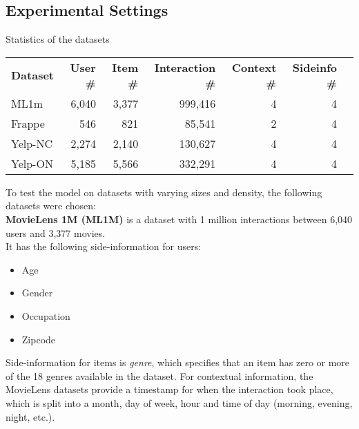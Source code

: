 \subsection{Experimental Settings}
\begin{adjustwidth}{-2.5 cm}{-2.5 cm}\centering
\begin{threeparttable}[!htb]
\caption{Statistics of the datasets}\label{tab:datasetstats}
\scriptsize
\begin{tabular}{lrrrrrr}\toprule
\textbf{Dataset} &\textbf{User \#} &\textbf{Item \#} &\textbf{Interaction \#} &\textbf{Context \#} &\textbf{Sideinfo \#} \\\cmidrule{1-6}
ML1m &6,040 &3,377 &999,416 &4 &4 \\\cmidrule{1-6}
Frappe &546 & 821 &85,541 &2 &4 \\\cmidrule{1-6}
Yelp-NC &2,274 &2,140 &130,627 &4 &4 \\\cmidrule{1-6}
Yelp-ON &5,185 &5,566 &332,291 &4 &4 \\\midrule
\bottomrule
\end{tabular}
\end{threeparttable}
\end{adjustwidth}
To test the model on datasets with varying sizes and density, the following datasets were chosen:\\
\textbf{MovieLens 1M (ML1M)} is a dataset with 1 million interactions between 6,040 users and 3,377 movies.\\
It has the following side-information for users:
\begin{itemize}
    \item Age
    \item Gender
    \item Occupation
    \item Zipcode
\end{itemize}
Side-information for items is \textit{genre}, which specifies that an item has zero or more of the 18 genres available in the dataset.
For contextual information, the MovieLens datasets provide a timestamp for when the interaction took place, which is split into a month, day of week, hour and time of day (morning, evening, night, etc.).\\\\

